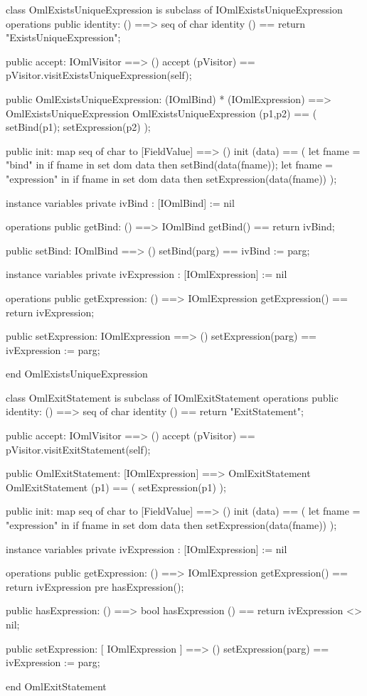 \begin{vdm_al}
class OmlExistsUniqueExpression is subclass of IOmlExistsUniqueExpression
operations
  public identity: () ==> seq of char
  identity () == return "ExistsUniqueExpression";

  public accept: IOmlVisitor ==> ()
  accept (pVisitor) == pVisitor.visitExistsUniqueExpression(self);

  public OmlExistsUniqueExpression:
      (IOmlBind) *
      (IOmlExpression) ==> OmlExistsUniqueExpression
  OmlExistsUniqueExpression (p1,p2) == 
   ( setBind(p1);
     setExpression(p2) );

  public init: map seq of char to [FieldValue] ==> ()
  init (data) ==
    ( let fname = "bind" in
        if fname in set dom data
        then setBind(data(fname));
      let fname = "expression" in
        if fname in set dom data
        then setExpression(data(fname)) );

instance variables
  private ivBind : [IOmlBind] := nil

operations
  public getBind: () ==> IOmlBind
  getBind() == return ivBind;

  public setBind: IOmlBind ==> ()
  setBind(parg) == ivBind := parg;

instance variables
  private ivExpression : [IOmlExpression] := nil

operations
  public getExpression: () ==> IOmlExpression
  getExpression() == return ivExpression;

  public setExpression: IOmlExpression ==> ()
  setExpression(parg) == ivExpression := parg;

end OmlExistsUniqueExpression
\end{vdm_al}

\begin{vdm_al}
class OmlExitStatement is subclass of IOmlExitStatement
operations
  public identity: () ==> seq of char
  identity () == return "ExitStatement";

  public accept: IOmlVisitor ==> ()
  accept (pVisitor) == pVisitor.visitExitStatement(self);

  public OmlExitStatement:
      [IOmlExpression] ==> OmlExitStatement
  OmlExitStatement (p1) == 
   ( setExpression(p1) );

  public init: map seq of char to [FieldValue] ==> ()
  init (data) ==
    ( let fname = "expression" in
        if fname in set dom data
        then setExpression(data(fname)) );

instance variables
  private ivExpression : [IOmlExpression] := nil

operations
  public getExpression: () ==> IOmlExpression
  getExpression() == return ivExpression
    pre hasExpression();

  public hasExpression: () ==> bool
  hasExpression () == return ivExpression <> nil;

  public setExpression: [ IOmlExpression ] ==> ()
  setExpression(parg) == ivExpression := parg;

end OmlExitStatement
\end{vdm_al}


